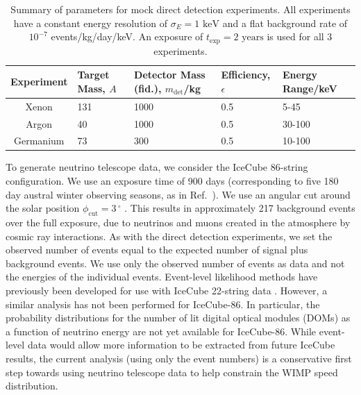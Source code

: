 \begin{table}[t]
  \setlength{\extrarowheight}{2pt}
  \begin{center}
	\begin{tabular}{c|m{1.2cm}m{2.2cm}m{2cm}m{2.1cm}}
        \hline\hline
	Experiment  & Target Mass, $A$ & Detector Mass (fid.), $m_\textrm{det}$/kg & Efficiency, $\epsilon$ & Energy Range/keV\\
	\hline
	Xenon  & 131  & 1000 & 0.5  & 5-45 \\
	Argon  & 40  & 1000 & 0.5  & 30-100  \\
        Germanium  & 73  & 300  & 0.5  & 10-100 \\
        \hline\hline
	\end{tabular}
  \end{center}
\caption[Summary of parameters for the mock direct detection experiments used in Chapter~\ref{ch:NT}]{Summary of parameters for mock direct detection experiments. All experiments have a constant energy resolution of $\sigma_E = 1 \textrm{ keV}$ and a flat background rate of $10^{-7}$ events/kg/day/keV. An exposure of $t_\textrm{exp} = 2 \textrm{ years}$ is used for all 3 experiments.}
\label{tab:NT:experiments}
\end{table}


To generate neutrino telescope data, we consider the IceCube 86-string configuration. We use an exposure time of 900 days (corresponding to five 180 day austral winter observing seasons, as in Ref.~\cite{Arina:2013}). We use an angular cut around the solar position $\phi_\textrm{cut} = 3\,^{\circ}$ \cite{Arina:2013}. This results in approximately 217 background events over the full exposure, due to neutrinos and muons created in the atmosphere by cosmic ray interactions. As with the direct detection experiments, we set the observed number of events equal to the expected number of signal plus background events. We use only the observed number of events as data and not the energies of the individual events. Event-level likelihood methods have previously been developed \cite{Scott:2012} for use with IceCube 22-string data \cite{Abbasi:2009}. However, a similar analysis has not been performed for IceCube-86. In particular, the probability distributions for the number of lit digital optical modules (DOMs) as a function of neutrino energy are not yet available for IceCube-86. While event-level data would allow more information to be extracted from future IceCube results, the current analysis (using only the event numbers) is a conservative first step towards using neutrino telescope data to help constrain the WIMP speed distribution.

